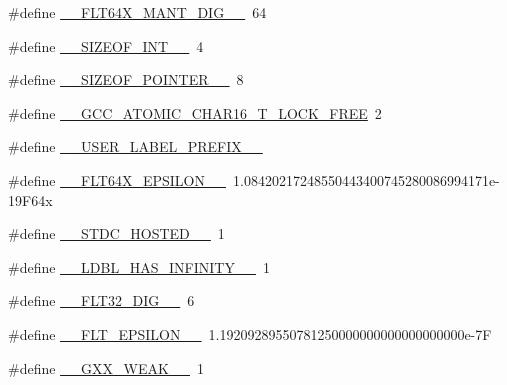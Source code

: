 \begin{DoxyCompactItemize}
\item 
\#define \hyperlink{cmake-build-debug_2babel__client__autogen_2moc__predefs_8h_ac070fafc444399b9243e0366b4ce4ef7}{\+\_\+\+\_\+\+F\+L\+T64\+X\+\_\+\+M\+A\+N\+T\+\_\+\+D\+I\+G\+\_\+\+\_\+}~64
\item 
\#define \hyperlink{cmake-build-debug_2babel__client__autogen_2moc__predefs_8h_a4b2be09502f3fe1cd13838c6761803b3}{\+\_\+\+\_\+\+S\+I\+Z\+E\+O\+F\+\_\+\+I\+N\+T\+\_\+\+\_\+}~4
\item 
\#define \hyperlink{cmake-build-debug_2babel__client__autogen_2moc__predefs_8h_a8bd657ce95940b7c6087cf5aa54d5280}{\+\_\+\+\_\+\+S\+I\+Z\+E\+O\+F\+\_\+\+P\+O\+I\+N\+T\+E\+R\+\_\+\+\_\+}~8
\item 
\#define \hyperlink{cmake-build-debug_2babel__client__autogen_2moc__predefs_8h_a7f18358ae5a65523140cb561bbeaa3a9}{\+\_\+\+\_\+\+G\+C\+C\+\_\+\+A\+T\+O\+M\+I\+C\+\_\+\+C\+H\+A\+R16\+\_\+\+T\+\_\+\+L\+O\+C\+K\+\_\+\+F\+R\+EE}~2
\item 
\#define \hyperlink{cmake-build-debug_2babel__client__autogen_2moc__predefs_8h_aff6bf0ff0fa3b5cbd23a8ae1131c87a9}{\+\_\+\+\_\+\+U\+S\+E\+R\+\_\+\+L\+A\+B\+E\+L\+\_\+\+P\+R\+E\+F\+I\+X\+\_\+\+\_\+}
\item 
\#define \hyperlink{cmake-build-debug_2babel__client__autogen_2moc__predefs_8h_a098c7fe44eed71241990da5db8f99bc3}{\+\_\+\+\_\+\+F\+L\+T64\+X\+\_\+\+E\+P\+S\+I\+L\+O\+N\+\_\+\+\_\+}~1.\+08420217248550443400745280086994171e-\/19\+F64x
\item 
\#define \hyperlink{cmake-build-debug_2babel__client__autogen_2moc__predefs_8h_a309fa84aefd09132258bbe21c20ef7d4}{\+\_\+\+\_\+\+S\+T\+D\+C\+\_\+\+H\+O\+S\+T\+E\+D\+\_\+\+\_\+}~1
\item 
\#define \hyperlink{cmake-build-debug_2babel__client__autogen_2moc__predefs_8h_a87140cc80075e8907e7bbfd910c5642a}{\+\_\+\+\_\+\+L\+D\+B\+L\+\_\+\+H\+A\+S\+\_\+\+I\+N\+F\+I\+N\+I\+T\+Y\+\_\+\+\_\+}~1
\item 
\#define \hyperlink{cmake-build-debug_2babel__client__autogen_2moc__predefs_8h_aa021702c3b7627dccaa51c33a2c5a8d1}{\+\_\+\+\_\+\+F\+L\+T32\+\_\+\+D\+I\+G\+\_\+\+\_\+}~6
\item 
\#define \hyperlink{cmake-build-debug_2babel__client__autogen_2moc__predefs_8h_a7ac5a3b1dc00b508a391f8c6c37e2165}{\+\_\+\+\_\+\+F\+L\+T\+\_\+\+E\+P\+S\+I\+L\+O\+N\+\_\+\+\_\+}~1.\+19209289550781250000000000000000000e-\/7F
\item 
\#define \hyperlink{cmake-build-debug_2babel__client__autogen_2moc__predefs_8h_afb5a2a4891df4551832357e97c6c3c59}{\+\_\+\+\_\+\+G\+X\+X\+\_\+\+W\+E\+A\+K\+\_\+\+\_\+}~1

\end{DoxyCompactItemize}
